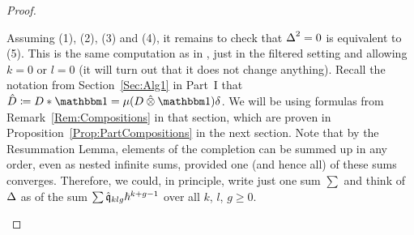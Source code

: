 \documentclass[\MainFolder/Text.tex]{subfiles}
\begin{document}
\begin{proof}
\begin{ProofList}
Assuming (1), (2), (3) and (4), it remains to check that $\operatorname{\Delta}^2 = 0$ is equivalent to (5). This is the same computation as in \cite[Section~2]{Cieliebak2015}, just in the filtered setting and allowing $k=0$ or $l=0$ (it will turn out that it does not change anything). Recall the notation from Section~\ref{Sec:Alg1} in Part~I that $\hat{D} \coloneqq D \Star \Id = \mu(D\COtimes \Id)\delta$. We will be using formulas from Remark~\ref{Rem:Compositions} in that section, which are proven in Proposition~\ref{Prop:PartCompositions} in the next section. Note that by the Resummation Lemma, elements of the completion can be summed up in any order, even as nested infinite sums, provided one (and hence all) of these sums converges. Therefore, we could, in principle, write just one sum $\sum$ and think of $\operatorname{\Delta}$ as of the sum $\sum \hat{\mathfrak{q}}_{klg} \hbar^{k+g-1}$ over all $k$, $l$, $g\ge 0$.


\end{ProofList}
\end{proof}
\end{document}
